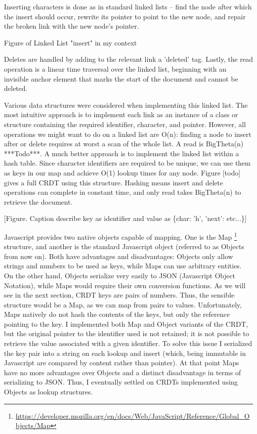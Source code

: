 \documentclass[12pt,a4paper,twoside,openright]{report}
\begin{document}
		Inserting characters is done as in standard linked lists -- find the node after which the insert should occur, rewrite its pointer to point to the new node, and repair the broken link with the new node's pointer.
		
		Figure of Linked List "insert" in my context
		
		Deletes are handled by adding to the relevant link a 'deleted' tag. Lastly, the read operation is a linear time traversal over the linked list, beginning with an invisible anchor element that marks the start of the document and cannot be deleted.
		
		Various data structures were considered when implementing this linked list. The most intuitive approach is to implement each link as an instance of a class or structure containing the required identifier, character, and pointer. However, all operations we might want to do on a linked list are O(n): finding a node to insert after or delete requires at worst a scan of the whole list. A read is BigTheta(n) ***Todo***. A much better approach is to implement the linked list within a hash table. Since character identifiers are required to be unique, we can use them as keys in our map and achieve O(1) lookup times for any node. Figure [todo] gives a full CRDT using this structure. Hashing means insert and delete operations can complete in constant time, and only read takes BigTheta(n) to retrieve the document.
		
		[Figure. Caption describe key as identifier and value as \{char: 'h', 'next': etc...\}]
		
		Javascript provides two native objects capable of mapping. One is the Map \footnote{\url{https://developer.mozilla.org/en/docs/Web/JavaScript/Reference/Global_Objects/Map}} structure, and another is the standard Javascript object (referred to as Objects from now on). Both have advantages and disadvantages: Objects only allow strings and numbers to be used as keys, while Maps can use arbitrary entities. On the other hand, Objects serialize very easily to JSON (Javascript Object Notation), while Maps would require their own conversion functions. As we will see in the next section, CRDT keys are pairs of numbers. Thus, the sensible structure would be a Map, as we can map from pairs to values. Unfortunately, Maps natively do not hash the contents of the keys, but only the reference pointing to the key. I implemented both Map and Object variants of the CRDT, but the original pointer to the identifier used is not retained; it is not possible to retrieve the value associated with a given identifier. To solve this issue I serialized the key pair into a string on each lookup and insert (which, being immutable in Javascript are compared by content rather than pointer). At that point Maps have no more advantages over Objects and a distinct disadvantage in terms of serializing to JSON. Thus, I eventually settled on CRDTs implemented using Objects as lookup structures.
		
\end{document}
